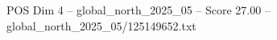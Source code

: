 \begin{textsample}{POS Dim 4 – global\_north\_2025\_05 – Score 27.00 – global\_north\_2025\_05/125149652.txt}
\end{textsample}

